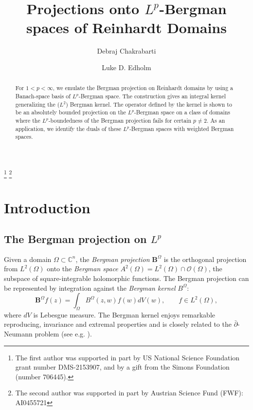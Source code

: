 \documentclass[letterpaper,11pt,reqno]{amsart}
\theoremstyle{plain}
\theoremstyle{definition}
\theoremstyle{remark}
\theoremstyle{remark}
\numberwithin{equation}{section}
\newcommand{\dbar}{\bar \partial}
\newcommand{\C}{{\mathbb C}}
\begin{document}
\title[Projections onto Bergman spaces]{Projections onto $L^p$-Bergman spaces of Reinhardt Domains}
\author{Debraj Chakrabarti \and Luke D. Edholm}
\begin{abstract}
For $1<p<\infty$, we emulate the Bergman projection on Reinhardt domains by using a Banach-space basis of $L^p$-Bergman space. 
The construction gives  an integral kernel generalizing the  ($L^2$) Bergman kernel. 
The operator defined by the kernel is shown to be an absolutely bounded projection on the $L^p$-Bergman space  on a class of domains where the $L^p$-boundedness of the Bergman projection fails for certain $p \neq 2$.
As an application, we identify the duals of these $L^p$-Bergman spaces with weighted Bergman spaces.
\end{abstract}

\thanks{The first author was supported in part by US National Science
Foundation grant number DMS-2153907, and by a gift from the Simons 
Foundation (number 706445).}
\thanks{The second author was supported in part by Austrian Science Fund 
(FWF): AI0455721}
\address{Department of Mathematics\\Central Michigan University\\Mt. Pleasant, MI 48859, USA}
\address{Department of Mathematics\\Universit\"at Wien, Vienna, Austria}
\maketitle 




\section{Introduction}
\subsection{The Bergman projection on \texorpdfstring{$L^p$}{lp}}
\label{sec-introintro} Given a domain $\Omega \subset \C^n$, the {\em Bergman projection} $\bm{B}^\Omega$ is the orthogonal projection from $L^2(\Omega)$ onto the \emph{Bergman space} $A^2(\Omega)=L^2(\Omega)\cap \mathcal{O}(\Omega)$, the  subspace of square-integrable holomorphic functions. 
The Bergman projection  can be represented by integration against the \emph{Bergman kernel} $B^\Omega$: 
\begin{equation}\label{eq-bergmanproj}
\bm{B}^\Omega f(z)= \int_\Omega B^\Omega(z,w) f(w)dV(w),\qquad f\in L^2(\Omega),
\end{equation}
where $dV$ is Lebesgue measure.  The Bergman kernel enjoys 
remarkable reproducing, invariance and extremal properties and is closely 
related to the $\dbar$-Neumann problem 
(see e.g.\! \cite{bergmanbook, follandkohn, krantzbergman}). 
\end{document}
